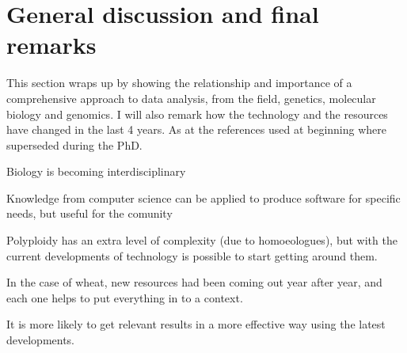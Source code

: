 
\chapter{General discussion and final remarks}
This section wraps up by showing the relationship and importance of a comprehensive approach to data analysis, from the field, genetics, molecular biology and genomics. I will also remark how the technology and the resources have changed in the last 4 years. As at the references used at beginning where superseded during the PhD. 


Biology is becoming interdisciplinary

Knowledge from  computer science can be applied to produce software for specific needs, but useful for the comunity

Polyploidy has an extra level of complexity (due to homoeologues), but with the current developments of technology is possible to start getting around them. 

In the case of wheat, new resources had been coming out year after year, and each one helps to put everything in to a context. 

It is more likely to get relevant results in a more effective way using the latest developments. 


